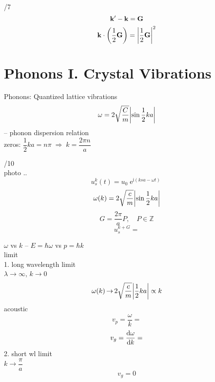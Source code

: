 \documentclass[UTF8]{ctexart} %
\DeclareMathOperator{\e}{\mathrm{e}}
\renewcommand{\I}{\mathrm{i}}
\DeclareMathOperator{\ra}{\rightarrow}
\DeclareMathOperator{\dra}{\Rightarrow}
\numberwithin{equation}{section}
\begin{document}
/7\\
\begin{equation}\label{key}
\vb{k}' - \vb{k} = \vb{G}
\end{equation}
\begin{equation}\label{key}
\vb{k}\cdot\qty(\dfrac{1}{2}\vb{G}) = \abs{\dfrac{1}{2}\vb{G}}^2
\end{equation}

\setcounter{section}{3}
\section{Phonons I. Crystal Vibrations}
Phonons: Quantized lattice vibrations\\

\begin{equation}\label{key}
\omega = 2\sqrt{\dfrac{C}{m}}\abs{\sin\dfrac{1}{2}ka}
\end{equation}
-- phonon dispersion relation\\
zeros: $ \dfrac{1}{2}ka = n\pi \;\dra\; k = \dfrac{2\pi n}{a}$

/10\\
photo ..
\begin{equation}\label{key}
u_s^k(t) = u_0\e^{\I(ksa-\omega t)}
\end{equation}
\begin{equation}\label{key}
\omega(k) = 2\sqrt{\dfrac{c}{m}}\abs{\sin\dfrac{1}{2}ka}
\end{equation}
\begin{equation}\label{key}
G = \dfrac{2\pi}{a}P, \quad P\in\mathbb{Z}
\end{equation}
\begin{equation}\label{key}
u_s^{k+G} = 
\end{equation}

$ \omega $ vs $ k $ -- $ E=\hbar\omega $ vs $ p=\hbar k $\\

limit\\
1. long wavelength limit\\
$ \lambda \ra\infty $, $ k\ra 0 $
\begin{equation}\label{key}
\omega(k) \ra 2\sqrt{\dfrac{c}{m}}\abs{\dfrac{1}{2}ka} \propto k
\end{equation}
acoustic \\
\begin{equation}\label{key}
v_p = \dfrac{\omega}{k} = 
\end{equation}
\begin{equation}\label{key}
v_g = \dv{\omega}{k} = 
\end{equation}
2. short wl limit\\
$ k\ra\dfrac{\pi}{a} $\\
\begin{equation}\label{key}
v_g = 0
\end{equation}
\end{document}
